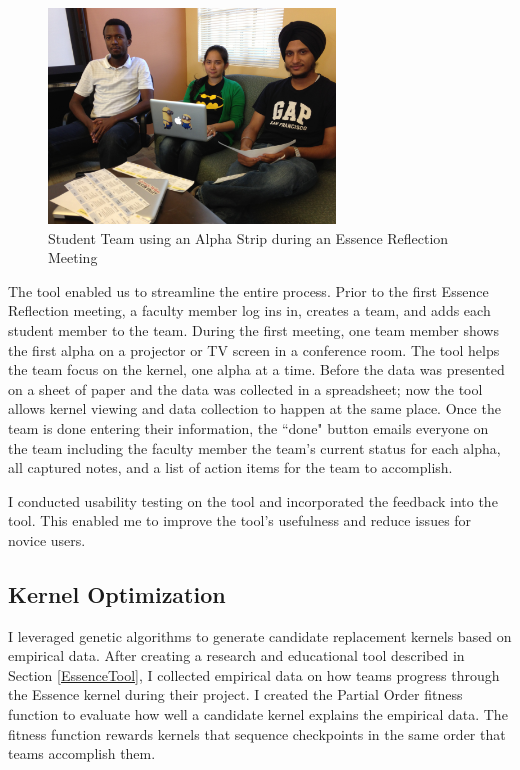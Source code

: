 \documentclass[preprint,12pt,3p]{elsarticle}
\begin{document}
\begin{figure}[ht]
\centering
\includegraphics[width=3.00in]{student_photos/team_1}
\caption{Student Team using an Alpha Strip during an Essence Reflection Meeting}
\label{AlphaStrip}
\end{figure}

The tool enabled us to streamline the entire process. Prior to the first Essence Reflection meeting, a faculty member log ins in, creates a team, and adds each student member to the team. During the first meeting, one team member shows the first alpha on a projector or TV screen in a conference room. The tool helps the team focus on the kernel, one alpha at a time. Before the data was presented on a sheet of paper and the data was collected in a spreadsheet; now the tool allows kernel viewing and data collection to happen at the same place. Once the team is done entering their information, the ``done" button emails everyone on the team including the faculty member the team's current status for each alpha, all captured notes, and a list of action items for the team to accomplish. 

I conducted usability testing on the tool and incorporated the feedback into the tool. This enabled me to improve the tool's usefulness and reduce issues for novice users. 

\subsection{Kernel Optimization}
\label{KernelOptimization}
I leveraged genetic algorithms to generate candidate replacement kernels based on empirical data. \cite{SCSE2015} After creating a research and educational tool described in Section \ref{EssenceTool}, I collected empirical data on how teams progress through the Essence kernel during their project. I created the Partial Order fitness function to evaluate how well a candidate kernel explains the empirical data. The fitness function rewards kernels that sequence checkpoints in the same order that teams accomplish them. 
\end{document}
